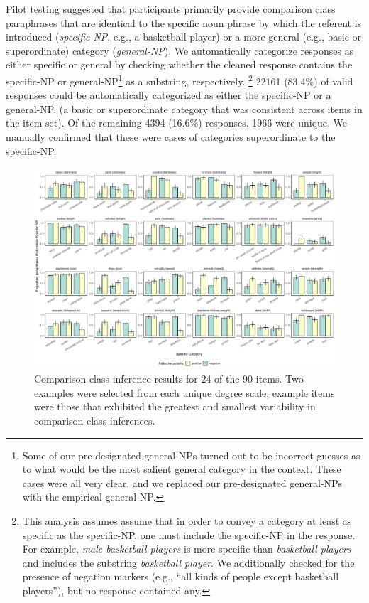 \documentclass[doc]{apa6}
\begin{document}
Pilot testing suggested that participants primarily provide comparison class paraphrases that are identical to the specific noun phrase by which the referent is introduced (\emph{specific-NP}, e.g., a basketball player) or a more general (e.g., basic or superordinate) category (\emph{general-NP}). 
We automatically categorize responses as either specific or general by checking whether the cleaned response contains the specific-NP or general-NP\footnote{Some of our pre-designated general-NPs turned out to be incorrect guesses as to what would be the most salient general category in the context. These cases were all very clear, and we replaced our pre-designated general-NPs with the empirical general-NP.} as a substring, respectively. \footnote{This analysis assumes assume that in order to convey a category at least as specific as the specific-NP, one must include the specific-NP in the response. 
For example, \emph{male basketball players} is more specific than \emph{basketball players} and includes the substring \emph{basketball player}. We additionally checked for the presence of negation markers (e.g., ``all kinds of people except basketball players''), but no response contained any.}
22161 (83.4\%) of valid responses could be automatically categorized as either the specific-NP or a general-NP. (a basic or superordinate category that was consistent across items in the item set). 
Of the remaining 4394 (16.6\%) responses, 1966 were unique. 
We manually confirmed that these were cases of categories superordinate to the specific-NP.

\begin{figure}[t!]
\centering
\includegraphics[width=\textwidth]{figs/bars_cc_finalExpt_prereg_byItem.pdf}
\caption{Comparison class inference results for 24 of the 90 items. Two examples were selected from each unique degree scale; example items were those that exhibited the greatest and smallest variability in comparison class inferences.}\label{fig:ccInferenceItems}
\end{figure}
\end{document}
